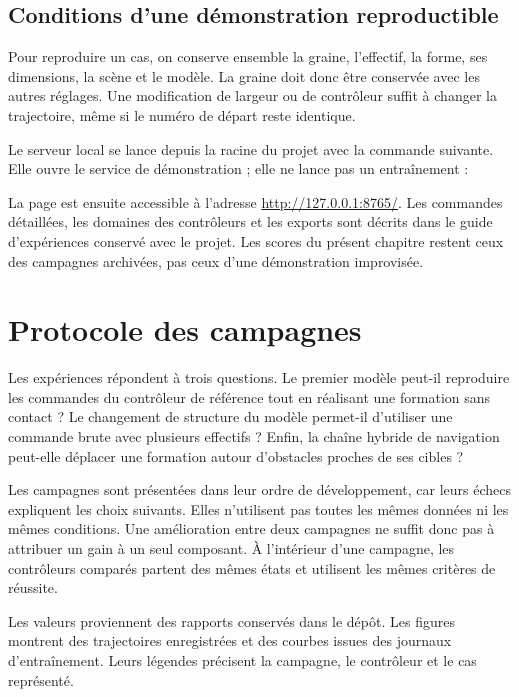 \subsection{Conditions d'une démonstration reproductible}
Pour reproduire un cas, on conserve ensemble la graine, l'effectif, la forme, ses dimensions, la scène et le modèle. La graine doit donc être conservée avec les autres réglages. Une modification de largeur ou de contrôleur suffit à changer la trajectoire, même si le numéro de départ reste identique.

Le serveur local se lance depuis la racine du projet avec la commande suivante. Elle ouvre le service de démonstration ; elle ne lance pas un entraînement :
\begin{quote}\ttfamily{}\end{quote}
La page est ensuite accessible à l'adresse \url{http://127.0.0.1:8765/}. Les commandes détaillées, les domaines des contrôleurs et les exports sont décrits dans le guide d'expériences conservé avec le projet. Les scores du présent chapitre restent ceux des campagnes archivées, pas ceux d'une démonstration improvisée.

\section{Protocole des campagnes}
Les expériences répondent à trois questions. Le premier modèle peut-il reproduire les commandes du contrôleur de référence tout en réalisant une formation sans contact ? Le changement de structure du modèle permet-il d'utiliser une commande brute avec plusieurs effectifs ? Enfin, la chaîne hybride de navigation peut-elle déplacer une formation autour d'obstacles proches de ses cibles ?

Les campagnes sont présentées dans leur ordre de développement, car leurs échecs expliquent les choix suivants. Elles n'utilisent pas toutes les mêmes données ni les mêmes conditions. Une amélioration entre deux campagnes ne suffit donc pas à attribuer un gain à un seul composant. À l'intérieur d'une campagne, les contrôleurs comparés partent des mêmes états et utilisent les mêmes critères de réussite.

Les valeurs proviennent des rapports conservés dans le dépôt. Les figures montrent des trajectoires enregistrées et des courbes issues des journaux d'entraînement. Leurs légendes précisent la campagne, le contrôleur et le cas représenté.

